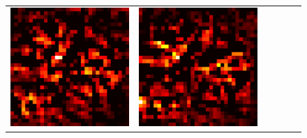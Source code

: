 \documentclass[preprint,12pt]{elsarticle}
\begin{document}
\begin{figure}[p]
\begin{tabular}{cccccc}
  \includegraphics[scale=\scale]{../visualizations/examples/cifar10/cnn/active_saliency_map/7.png} & 
  \includegraphics[scale=\scale]{../visualizations/examples/cifar10/cnn/inactive_saliency_map/7.png} \\
  

\end{tabular}
\end{figure}
\end{document}
